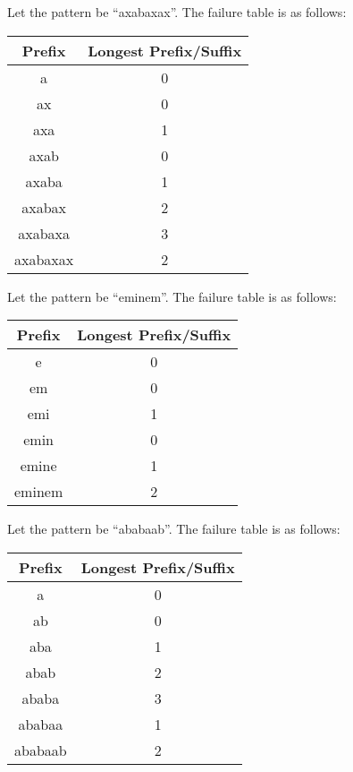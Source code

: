 \documentclass[a4paper]{article}
\begin{document}
\begin{eg}
	Let the pattern be ``axabaxax''. The failure table is as follows:
	\begin{center}
		\begin{tabular}{|c|c|}
			\hline
			\textbf{Prefix} & \textbf{Longest Prefix/Suffix} \\
			\hline
			a & 0 \\
			ax & 0 \\
			axa & 1 \\
			axab & 0 \\
			axaba & 1 \\
			axabax & 2 \\
			axabaxa & 3 \\
			axabaxax & 2 \\
			\hline
		\end{tabular}
	\end{center}
\end{eg}

\begin{eg}
	Let the pattern be ``eminem''. The failure table is as follows:
	\begin{center}
		\begin{tabular}{|c|c|}
			\hline
			\textbf{Prefix} & \textbf{Longest Prefix/Suffix} \\
			\hline
			e & 0 \\
			em & 0 \\
			emi & 1 \\
			emin & 0 \\
			emine & 1 \\
			eminem & 2 \\
			\hline
		\end{tabular}
	\end{center}
\end{eg}

\begin{eg}
	Let the pattern be ``ababaab''. The failure table is as follows:
	\begin{center}
		\begin{tabular}{|c|c|}
			\hline
			\textbf{Prefix} & \textbf{Longest Prefix/Suffix} \\
			\hline
			a & 0 \\
			ab & 0 \\
			aba & 1 \\
			abab & 2 \\
			ababa & 3 \\
			ababaa & 1 \\
			ababaab & 2 \\
			\hline
		\end{tabular}
	\end{center}
\end{eg}
\end{document}
